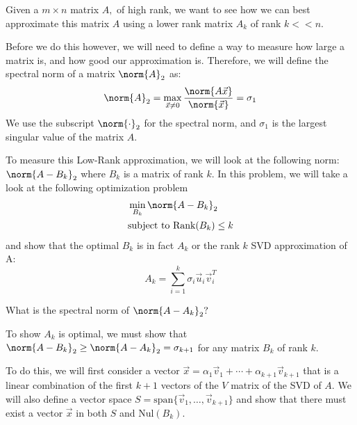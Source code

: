 

Given a $m \times n$ matrix $A,$ of high rank, we want to see how we can best approximate this matrix $A$ using a lower rank matrix $A_{k}$ of rank $k << n.$ 

Before we do this however, we will need to define a way to measure how large a matrix is, and how good our approximation is. Therefore, we will define the spectral norm of a matrix $\norm{A}_{2}$ as:
\begin{equation}
  \norm{A}_{2} = \max_{\vec{x} \neq 0} \frac{\norm{A \vec{x}}}{\norm{\vec{x}}} = \sigma_{1}
\end{equation}
We use the subscript $\norm{\cdot}_{2}$ for the spectral norm, and $\sigma_{1}$ is the largest singular value of the matrix $A.$

To measure this Low-Rank approximation, we will look at the following norm:
$\norm{A - B_{k}}_{2}$
where $B_{k}$ is a matrix of rank $k.$ In this problem, we will take a look at the following optimization problem
\begin{align*}
  &\min_{B_{k}}{\norm{A - B_{k}}_{2}} \\
  &\text{subject to} \ \text{Rank}(B_k) \leq k
\end{align*}
and show that the optimal $B_{k}$ is in fact $A_{k}$ or the rank $k$ SVD approximation of A:
\begin{equation}
  A_{k} = \sum\limits_{i = 1}^{k} \sigma_{i} \vec{u}_{i} \vec{v}_{i}^{T}
\end{equation}

\begin{enumerate}
  \qitem What is the spectral norm of $\norm{A - A_{k}}_{2}?$

\end{enumerate}

To show $A_{k}$ is optimal, we must show that $\norm{A - B_{k}}_{2} \geq \norm{A - A_{k}}_{2} = \sigma_{k+1}$ for any matrix $B_{k}$ of rank $k.$

To do this, we will first consider a vector $\vec{x} = \alpha_{1} \vec{v}_{1} + \cdots + \alpha_{k + 1} \vec{v}_{k + 1}$ that is a linear combination of the first $k + 1$ vectors of the $V$ matrix of the SVD of $A.$ 
We will also define a vector space $S = \text{span}\{ \vec{v}_{1}, \dotsc, \vec{v}_{k+1} \}$ and show that there must exist a vector $\vec{x}$ in both $S$ and $\text{Nul}(B_{k}).$

